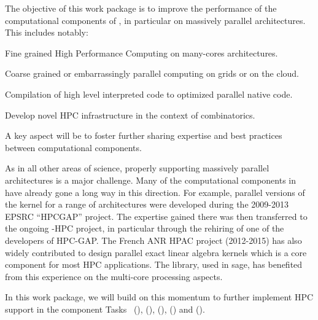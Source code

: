 \begin{workpackage}[id=hpc,wphases=0-48,
  short=High Performance Math. Computing,%
  title=High Performance Mathematical Computing,
  lead=UJF,
  USHRM=12, %
  PSRM=6,   %
  LLRM=12,  %
  SARM=18, %
  UKRM=60, %
  UBRM=40,  %
  UJFRM=52] %
  

\begin{wpobjectives}
  The objective of this work package is to improve the performance of
  the computational components of \TheProject, in particular on
  massively parallel architectures. This includes notably:
  \begin{compactitem}
  \item Fine grained High Performance Computing on many-cores architectures.
  \item Coarse grained or embarrassingly parallel computing on grids or on the cloud.
  \item Compilation of high level interpreted code to optimized parallel native code.
  \item Develop novel HPC infrastructure in the context of combinatorics.
  \end{compactitem}
  A key aspect will be to foster further sharing expertise and best
  practices between computational components.
\end{wpobjectives}

\begin{wpdescription}
  As in all other areas of science, properly supporting massively
  parallel architectures is a major challenge. Many of the
  computational components in \TheProject have already gone a long way
  in this direction. For example, parallel versions
  of the \GAP kernel for
  a range of architectures were developed during the 2009-2013 EPSRC
  ``HPCGAP'' project. The expertise
  gained there was then transferred to the ongoing \Singular-HPC
  project, in particular through the rehiring of one of the developers
  of HPC-GAP. The French ANR HPAC project (2012-2015) has also widely contributed to design
  parallel exact linear algebra kernels  which is a core component for most HPC
  applications. The \Linbox library, used in sage, has benefited from this
  experience on the multi-core processing aspects. 

  In this work package, we will build on this momentum to further implement HPC support in
  the component Tasks~ (\Pari), (\GAP),
   (\Linbox), (\MPIR) and
   (\Singular).
  

\end{wpdescription}
\end{workpackage}
